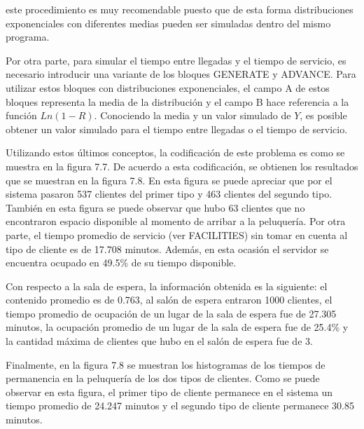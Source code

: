 \documentclass[11pt,letterpaper]{report}
\begin{document}
este procedimiento es muy recomendable puesto que de esta forma
distribuciones exponenciales con diferentes medias pueden ser simuladas
dentro del mismo programa.

Por otra parte, para simular el tiempo entre llegadas y el tiempo de
servicio, es necesario introducir una variante de los bloques GENERATE
y ADVANCE. Para utilizar estos bloques con distribuciones exponenciales,
el campo A de estos bloques representa la media de la distribución y el
campo B hace referencia a la función $Ln(1-R)$. Conociendo la media y un
valor simulado de $Y$, es posible obtener un valor simulado para el
tiempo entre llegadas o el tiempo de servicio.

Utilizando estos últimos conceptos, la codificación de este problema es
como se muestra en la figura 7.7. De acuerdo a esta codificación, se
obtienen los resultados que se muestran en la figura 7.8. En esta figura
se puede apreciar que por el sistema pasaron 537 clientes del primer
tipo y 463 clientes del segundo tipo. También en esta figura se puede
observar que hubo 63 clientes que no encontraron espacio disponible al
momento de arribar a la peluquería. Por otra parte, el tiempo promedio
de servicio (ver FACILITIES) sin tomar en cuenta al tipo de cliente es
de 17.708 minutos. Además, en esta ocasión el servidor se encuentra
ocupado en 49.5\% de su tiempo disponible.

Con respecto a la sala de espera, la información obtenida es la
siguiente: el contenido promedio es de 0.763, al salón de espera
entraron 1000 clientes, el tiempo promedio de ocupación de un lugar de
la sala de espera fue de 27.305 minutos, la ocupación promedio de un
lugar de la sala de espera fue de 25.4\% y la cantidad máxima de
clientes que hubo en el salón de espera fue de 3.

Finalmente, en la figura 7.8 se muestran los histogramas de los tiempos
de permanencia en la peluquería de los dos tipos de clientes. Como se
puede observar en esta figura, el primer tipo de cliente permanece en
el sistema un tiempo promedio de 24.247 minutos y el segundo tipo de
cliente permanece 30.85 minutos.
\end{document}
